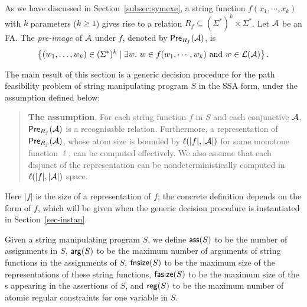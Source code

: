 As we have discussed in Section~\ref{subsec:symexe}, a string function $f(x_1, \cdots, x_k)$ with $k$ parameters ($k\geq 1$) gives rise to a relation $R_f\subseteq (\Sigma^*)^k \times \Sigma^*$. Let $\mathcal{A}$ be an FA. The \emph{pre-image} of $\mathcal{A}$ under $f$, denoted by $\textsf{Pre}_{R_f}(\mathcal{A})$, is 
\[\left\{(w_1,\ldots, w_k) \in (\Sigma^*)^k \mid \exists w.\ w\in f(w_1, \cdots, w_k)\text{ and } w\in\mathcal{L}(\mathcal{A}) \right\}.\]

%

The main result of this section is a generic decision procedure for the path feasibility problem of string manipulating program $S$ in the SSA form, under the \prerec{} assumption defined below:
\begin{quote}
{\bf The \prerec{} assumption}. For each string function $f$ in $S$ and each conjunctive \FA{} $\mathcal{A}$,  $\textsf{Pre}_{R_f}(\mathcal{A})$ is a recognisable relation. Furthermore, 
a representation of $\textsf{Pre}_{R_f}(\mathcal{A})$, whose atom size is bounded by  $\ell(|f|, |\mathcal{A}|)$ for some monotone function $\ell$, can be computed effectively. We also assume that each disjunct of the representation can be nondeterministically computed in $\ell(|f|, |\mathcal{A}|)$ space.
%
\end{quote} 

Here $|f|$ is the size of a representation of $f$; the concrete definition depends on the form of $f$, which will be given when the generic decision procedure is instantiated in Section~\ref{sec-instan}. 

Given a string manipulating program $S$, 
we define $\mathsf{ass}(S)$ to be the number of assignments in $S$, $\mathsf{arg}(S)$ to be the maximum number of arguments of string functions in the assignments of $S$, $\mathsf{fnsize}(S)$ to be the maximum size of the representations of these string functions, $\mathsf{fasize}(S)$ to be the maximum size of the \FA{}s appearing in the assertions of $S$, and $\mathsf{reg}(S)$ to be the maximum number of atomic regular constraints for one variable in $S$.


